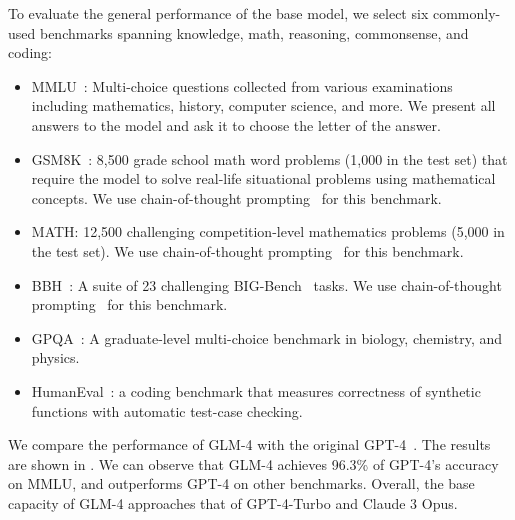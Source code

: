 To evaluate the general performance of the base model, we select six commonly-used benchmarks spanning knowledge, math, reasoning, commonsense, and coding:
\begin{itemize}
    \item MMLU~\cite{hendrycks2021measuring}: Multi-choice questions collected from various examinations including mathematics, history, computer science, and more. We present all answers to the model and ask it to choose the letter of the answer. 
    \item GSM8K~\cite{GSM8k:abs-2110-14168}: 8,500 grade school math word problems (1,000 in the test set) that require the model to solve real-life situational problems using mathematical concepts. We use chain-of-thought prompting~\cite{CoT:Wei0SBIXCLZ22} for this benchmark.
        \item MATH: 12,500 challenging competition-level mathematics problems (5,000 in the test set). We use chain-of-thought prompting~\cite{CoT:Wei0SBIXCLZ22} for this benchmark.
    \item BBH~\cite{BBH:SuzgunSSGTCCLCZ23}: A suite of 23 challenging BIG-Bench~\cite{BigBench:abs-2206-04615} tasks. We use chain-of-thought prompting~\cite{CoT:Wei0SBIXCLZ22} for this benchmark.
    \item GPQA~\cite{GPQA:abs-2311-12022}: A graduate-level multi-choice benchmark in biology, chemistry, and physics. 
    \item HumanEval~\cite{Humaneval:abs-2107-03374}: a coding benchmark that measures correctness of synthetic functions with automatic test-case checking. 
\end{itemize}

We compare the performance of GLM-4 with the original GPT-4~\cite{openai2023gpt}. 
The results are shown in . 
We can observe that GLM-4 achieves 96.3\% of GPT-4's accuracy on MMLU, and outperforms GPT-4 on other benchmarks. 
Overall, the base capacity of GLM-4 approaches that of GPT-4-Turbo and Claude 3 Opus.


